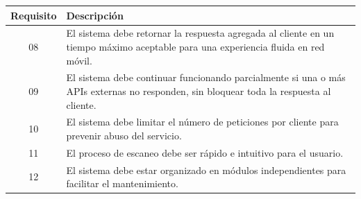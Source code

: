 \begin{center}
\begin{tabular}{c p{12cm}}
\toprule
\textbf{Requisito} & \textbf{Descripción} \\
\midrule
08 & El sistema debe retornar la respuesta agregada al cliente en un tiempo
     máximo aceptable para una experiencia fluida en red móvil. \\[6pt]

09 & El sistema debe continuar funcionando parcialmente si una o más
     APIs externas no responden, sin bloquear toda la respuesta al cliente. \\[6pt]

10 & El sistema debe limitar el número de peticiones por cliente para
   prevenir abuso del servicio. \\[6pt]

11 & El proceso de escaneo debe ser rápido e intuitivo para el usuario. \\[6pt]

12 & El sistema debe estar organizado en módulos independientes para
   facilitar el mantenimiento. \\[6pt]
\bottomrule
\end{tabular}
\end{center}
